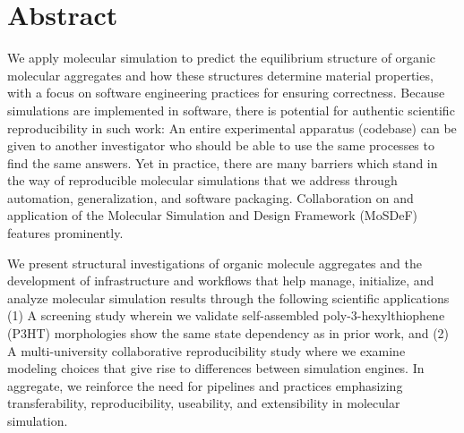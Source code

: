 
\chapter*{Abstract}

We apply molecular simulation to predict the equilibrium structure of organic molecular aggregates and how these structures determine material properties, with a focus on software engineering practices for ensuring correctness.
Because simulations are implemented in software, there is potential for authentic scientific reproducibility in such work: An entire experimental apparatus (codebase) can be given to another investigator who should be able to use the same processes to find the same answers.
Yet in practice, there are many barriers which stand in the way of reproducible molecular simulations that we address through automation, generalization, and software packaging. 
Collaboration on and application of the  Molecular Simulation and Design Framework (MoSDeF) features prominently.

We present structural investigations of organic molecule aggregates and the development of infrastructure and workflows that help manage, initialize, and analyze molecular simulation results through the following scientific applications (1)
A screening study wherein we validate self-assembled poly-3-hexylthiophene (P3HT) morphologies show the same state dependency as in prior work, and (2)
 A multi-university collaborative reproducibility study where we examine modeling choices that give rise to differences between simulation engines.
In aggregate, we reinforce the need for pipelines and practices emphasizing transferability, reproducibility, useability, and extensibility in molecular simulation.
